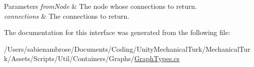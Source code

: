 \begin{DoxyParams}{Parameters}
{\em from\+Node} & The node whose connections to return.\\
\hline
{\em connections} & The connections to return.\\
\hline
\end{DoxyParams}


The documentation for this interface was generated from the following file\+:\begin{DoxyCompactItemize}
\item 
/\+Users/sabienambrose/\+Documents/\+Coding/\+Unity\+Mechanical\+Turk/\+Mechanical\+Turk/\+Assets/\+Scripts/\+Util/\+Containers/\+Graphs/\mbox{\hyperlink{_graph_types_8cs}{Graph\+Types.\+cs}}\end{DoxyCompactItemize}
